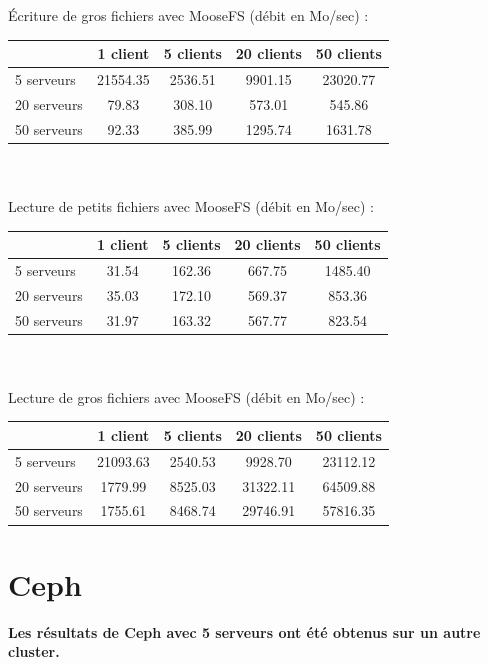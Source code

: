 \documentclass[12pt]{report}
\begin{document}
			Écriture de gros fichiers avec MooseFS (débit en Mo/sec) :

			\begin{tabular}{|l|c|c|c|c|}
				\hline
				& 1 client & 5 clients & 20 clients & 50 clients \\
				\hline
				5 serveurs & 21554.35 & 2536.51 & 9901.15 & 23020.77 \\
				\hline
				20 serveurs & 79.83 & 308.10 & 573.01 & 545.86 \\
				\hline
				50 serveurs & 92.33 & 385.99 & 1295.74 & 1631.78 \\
				\hline
			\end{tabular}\\\\

			Lecture de petits fichiers avec MooseFS (débit en Mo/sec) :

			\begin{tabular}{|l|c|c|c|c|}
				\hline
				& 1 client & 5 clients & 20 clients & 50 clients \\
				\hline
				5 serveurs & 31.54 & 162.36 & 667.75 & 1485.40 \\
				\hline
				20 serveurs & 35.03 & 172.10 & 569.37 & 853.36 \\
				\hline
				50 serveurs & 31.97 & 163.32 & 567.77 & 823.54 \\
				\hline
			\end{tabular}\\\\

			Lecture de gros fichiers avec MooseFS (débit en Mo/sec) :

			\begin{tabular}{|l|c|c|c|c|}
				\hline
				& 1 client & 5 clients & 20 clients & 50 clients \\
				\hline
				5 serveurs & 21093.63 & 2540.53 & 9928.70 & 23112.12 \\
				\hline
				20 serveurs & 1779.99 & 8525.03 & 31322.11 & 64509.88 \\
				\hline
				50 serveurs & 1755.61 & 8468.74 & 29746.91 & 57816.35 \\
				\hline
			\end{tabular}

			\newpage

			\section{Ceph}

			\textbf{Les résultats de Ceph avec 5 serveurs ont été obtenus sur un autre cluster.}\\
\end{document}
